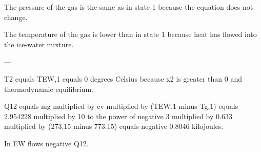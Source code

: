 The pressure of the gas is the same as in state 1 because the equation does not change.  

The temperature of the gas is lower than in state 1 because heat has flowed into the ice-water mixture.  

---

T2 equals TEW,1 equals 0 degrees Celsius because x2 is greater than 0 and thermodynamic equilibrium.  

Q12 equals mg multiplied by cv multiplied by (TEW,1 minus Tg,1) equals 2.954228 multiplied by 10 to the power of negative 3 multiplied by 0.633 multiplied by (273.15 minus 773.15) equals negative 0.8046 kilojoules.  

In EW flows negative Q12.